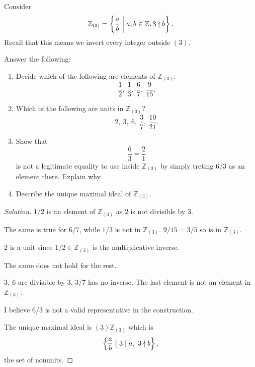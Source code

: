 \documentclass[11pt]{article}
\begin{document}
\begin{prob}
    Consider  
    \[
        \mathbb Z_{(3)} = \left\{\frac{a}{b} 
        \biggm| a,b \in \mathbb Z, 3 
        \nmid b\right\}. 
    \]
    Recall that this means we invert every 
    integer outside $(3)$. 

    Answer the following: 
    \begin{enumerate}
        \item Decide which of the following 
            are elements of $\mathbb Z_{(3)}$: 
            \[
                \frac{1}{2}, \ 
                \frac{1}{3}, \ 
                \frac{6}{7}, \ 
                \frac{9}{15}.  
            \]
        \item Which of the following are 
            units in $\mathbb Z_{(3)}$? 
            \[
                2, \ 
                3, \
                6, \
                \frac{3}{7}, \
                \frac{10}{21}.    
            \]
        \item Show that 
            \[
                \frac{6}{3} = \frac{2}{1} 
            \]  
            is not a legitimate equality to use 
            inside $\mathbb Z_{(3)}$ by simply 
            treting $6/3$ as an element there. 
            Explain why. 
        \item Describe the unique maximal ideal of 
            $\mathbb Z_{(3)}$. 
    \end{enumerate}
\end{prob}
\begin{proof}[Solution]
    $1/2$ is an element of $\mathbb Z_{(3)}$ as 
    $2$ is not divisible by $3$. 

    The same is true for $6/7$, while $1/3$  
    is not in $\mathbb Z_{(3)}$. 
    $9/15 = 3/5$ so is in $\mathbb Z_{(3)}$. 

    $2$ is a unit since $1/2 \in \mathbb Z_{(3)}$ is 
    the multiplicative inverse. 

    The same does not hold for the rest. 

    $3, \ 6$ are divisible by $3$, $3/7$ has no inverse.  
    The last element is not an element in $\mathbb Z_{(3)}$.  

    I believe $6/3$ is not a valid representative in the 
    construction. 

    The unique maximal ideal is 
    $(3) \mathbb Z_{(3)}$ which is 
    \[
        \left\{\frac{a}{b} \bigm| 3 \mid a, \ 3 \nmid b   
        \right\}, 
    \]
    the set of nonunits. 
\end{proof}
\end{document}
